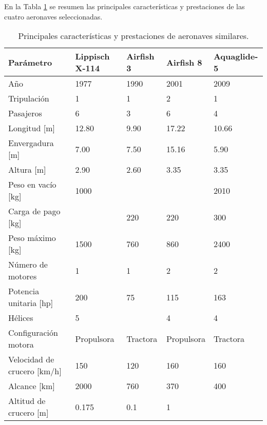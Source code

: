 \FloatBarrier

En la Tabla \ref{tab:similar} se resumen las principales características y prestaciones de las cuatro aeronaves seleccionadas.

\begin{table}[ht]
\centering
\caption{Principales características y prestaciones de aeronaves similares.}
\label{tab:similar}
\begin{tabular}{@{}lllll@{}}
\toprule
Parámetro                            & Lippisch X-114  & Airfish 3                 & Airfish 8  & Aquaglide-5      \\ \midrule
Año                                  & 1977            & 1990                      & 2001       & 2009             \\
Tripulación                          & 1               & 1                         & 2          & 1                \\
Pasajeros                            & 6               & 3                         & 6          & 4                \\ \hline
Longitud {[}m{]}                     & 12.80           & 9.90                      & 17.22      & 10.66            \\
Envergadura {[}m{]}                  & 7.00            & 7.50                      & 15.16      & 5.90             \\
Altura {[}m{]}                       & 2.90            & 2.60                      & 3.35       & 3.35             \\ \hline
Peso en vacío {[}kg{]}                         & 1000            &                           &            & 2010             \\
Carga de pago {[}kg{]}                          &                 & 220                       & 220        & 300              \\
Peso máximo {[}kg{]}                        & 1500            & 760                       & 860        & 2400             \\ \hline
Número de motores                    & 1               & 1                         & 2          & 2                \\
Potencia unitaria {[}hp{]}           & 200             & 75                        & 115        & 163              \\
Hélices                              & 5               &                           & 4          & 4                \\
Configuración motora                 & Propulsora      & Tractora                  & Propulsora & Tractora         \\ \hline
Velocidad de crucero {[}km/h{]} & 150             & 120                       & 160        & 160              \\
Alcance {[}km{]}                & 2000            & 760                       & 370        & 400              \\
Altitud de crucero {[}m{]} & 0.175           & 0.1                       & 1          &                  \\ \bottomrule
\end{tabular}
\end{table}


